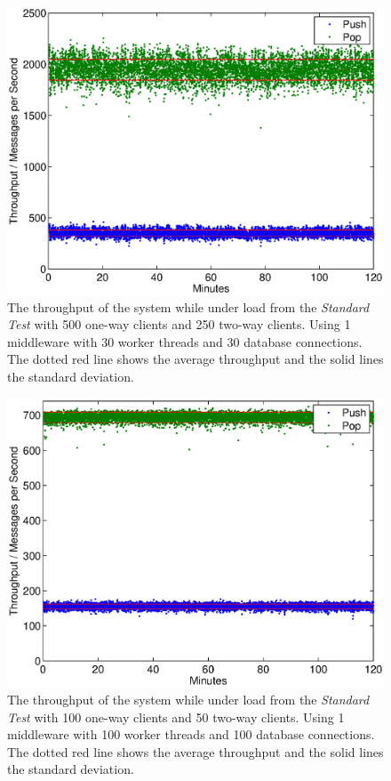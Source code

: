 \documentclass{article}
\begin{document}
            \begin{figure}[H]
                \hspace{-1.5cm}
                \includegraphics[scale=0.750]{2h_30threads_standardTest_500_250}
                \caption{The throughput of the system while under load from the \textit{Standard Test} with 500 one-way clients and 250 two-way clients. Using 1 middleware with 30 worker threads and 30 database connections. The dotted red line shows the average throughput and the solid lines the standard deviation.}
                \label{fig:2h_30threads_standardTest_500_250}
            \end{figure}
                
            \begin{figure}[H]
                \hspace{-1.5cm}
                \includegraphics[scale=0.750]{2h_100threads_standardTest_100_50}
                \caption{The throughput of the system while under load from the \textit{Standard Test} with 100 one-way clients and 50 two-way clients. Using 1 middleware with 100 worker threads and 100 database connections. The dotted red line shows the average throughput and the solid lines the standard deviation.}
                \label{fig:2h_100threads_standardTest_100_50}
            \end{figure}
                
\end{document}
